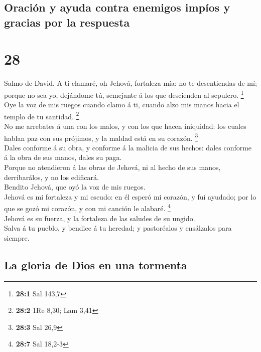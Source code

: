 \hypertarget{oraciuxf3n-y-ayuda-contra-enemigos-impuxedos-y-gracias-por-la-respuesta}{%
\subsection{Oración y ayuda contra enemigos impíos y gracias por la
respuesta}\label{oraciuxf3n-y-ayuda-contra-enemigos-impuxedos-y-gracias-por-la-respuesta}}

\hypertarget{section-27}{%
\section{28}\label{section-27}}

 Salmo de David. A ti clamaré, oh Jehová, fortaleza mía: no
te desentiendas de mí; porque no sea yo, dejándome tú, semejante á los
que descienden al sepulcro. \footnote{\textbf{28:1} Sal 143,7}\\
 Oye la voz de mis ruegos cuando clamo á ti, cuando alzo mis
manos hacia el templo de tu santidad. \footnote{\textbf{28:2} 1Re 8,30;
  Lam 3,41}\\
 No me arrebates á una con los malos, y con los que hacen
iniquidad: los cuales hablan paz con sus prójimos, y la maldad está en
su corazón. \footnote{\textbf{28:3} Sal 26,9}\\
 Dales conforme á su obra, y conforme á la malicia de sus
hechos: dales conforme á la obra de sus manos, dales su paga.\\
 Porque no atendieron á las obras de Jehová, ni al hecho de
sus manos, derribarálos, y no los edificará.\\
 Bendito Jehová, que oyó la voz de mis ruegos.\\
 Jehová es mi fortaleza y mi escudo: en él esperó mi
corazón, y fuí ayudado; por lo que se gozó mi corazón, y con mi canción
le alabaré. \footnote{\textbf{28:7} Sal 18,2-3}\\
 Jehová es su fuerza, y la fortaleza de las saludes de su
ungido.\\
 Salva á tu pueblo, y bendice á tu heredad; y pastoréalos y
ensálzalos para siempre.

\hypertarget{la-gloria-de-dios-en-una-tormenta}{%
\subsection{La gloria de Dios en una
tormenta}\label{la-gloria-de-dios-en-una-tormenta}}

